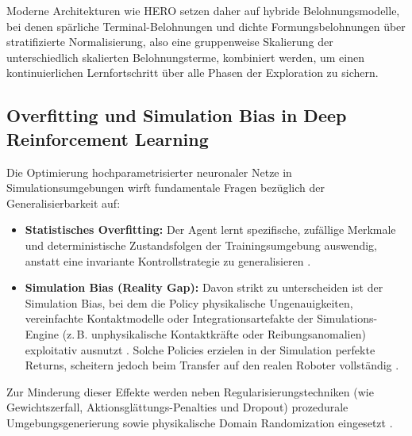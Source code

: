 Moderne Architekturen wie HERO \cite{taoHybridReinforcementWhen2025} setzen daher auf hybride Belohnungsmodelle, bei denen spärliche Terminal-Belohnungen und dichte Formungsbelohnungen über stratifizierte Normalisierung, also eine gruppenweise Skalierung der unterschiedlich skalierten Belohnungsterme, kombiniert werden, um einen kontinuierlichen Lernfortschritt über alle Phasen der Exploration zu sichern.

\subsection{Overfitting und Simulation Bias in Deep Reinforcement Learning}
Die Optimierung hochparametrisierter neuronaler Netze in Simulationsumgebungen wirft fundamentale Fragen bezüglich der Generalisierbarkeit auf:
\begin{itemize}
	\item \textbf{Statistisches Overfitting:} Der Agent lernt spezifische, zufällige Merkmale und deterministische Zustandsfolgen der Trainingsumgebung auswendig, anstatt eine invariante Kontrollstrategie zu generalisieren \cite{zhang2018studyoverfittingdeepreinforcement, cobbe2019quantifyinggeneralizationreinforcementlearning}.
	\item \textbf{Simulation Bias (Reality Gap):} Davon strikt zu unterscheiden ist der Simulation Bias, bei dem die Policy physikalische Ungenauigkeiten, vereinfachte Kontaktmodelle oder Integrationsartefakte der Simulations-Engine (z.\,B. unphysikalische Kontaktkräfte oder Reibungsanomalien) exploitativ ausnutzt \cite{pengSimtoRealTransferVisionguided2018}. Solche Policies erzielen in der Simulation perfekte Returns, scheitern jedoch beim Transfer auf den realen Roboter vollständig \cite{Kober_IJRR_2013, pengSimtoRealTransferVisionguided2018}.
\end{itemize}
Zur Minderung dieser Effekte werden neben Regularisierungstechniken (wie Gewichtszerfall, Aktionsglättungs-Penalties und Dropout) prozedurale Umgebungsgenerierung sowie physikalische Domain Randomization eingesetzt \cite{cobbe2019quantifyinggeneralizationreinforcementlearning, pengSimtoRealTransferVisionguided2018}.


